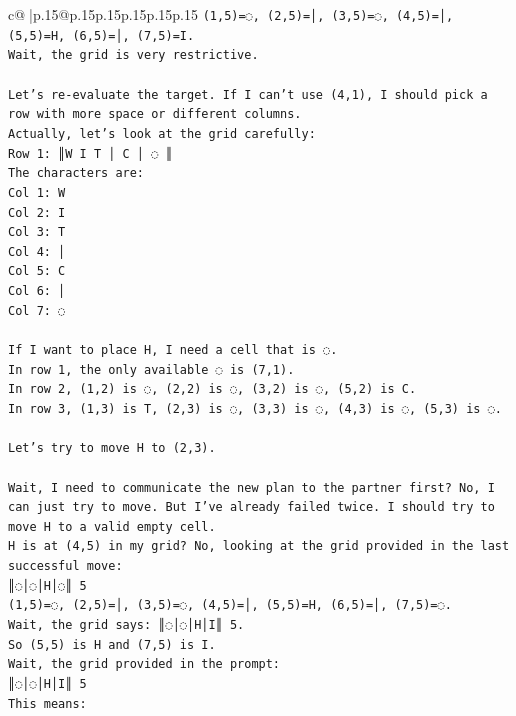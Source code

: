 \documentclass{article}
\begin{document}
{\begin{supertabular}{c@{$\;$}|p{.15\linewidth}@{}p{.15\linewidth}p{.15\linewidth}p{.15\linewidth}p{.15\linewidth}p{.15\linewidth}}
{{{\texttt{(1,5)=◌, (2,5)=│, (3,5)=◌, (4,5)=│, (5,5)=H, (6,5)=│, (7,5)=I.} \\
\texttt{Wait, the grid is very restrictive.} \\
\\ 
\texttt{Let's re{-}evaluate the target. If I can't use (4,1), I should pick a row with more space or different columns.} \\
\texttt{Actually, let's look at the grid carefully:} \\
\texttt{Row 1: ║W I T │ C │ ◌ ║} \\
\texttt{The characters are:} \\
\texttt{Col 1: W} \\
\texttt{Col 2: I} \\
\texttt{Col 3: T} \\
\texttt{Col 4: │} \\
\texttt{Col 5: C} \\
\texttt{Col 6: │} \\
\texttt{Col 7: ◌} \\
\\ 
\texttt{If I want to place H, I need a cell that is ◌.} \\
\texttt{In row 1, the only available ◌ is (7,1).} \\
\texttt{In row 2, (1,2) is ◌, (2,2) is ◌, (3,2) is ◌, (5,2) is C.} \\
\texttt{In row 3, (1,3) is T, (2,3) is ◌, (3,3) is ◌, (4,3) is ◌, (5,3) is ◌.} \\
\\ 
\texttt{Let's try to move H to (2,3).} \\
\\ 
\texttt{Wait, I need to communicate the new plan to the partner first? No, I can just try to move. But I've already failed twice. I should try to move H to a valid empty cell.} \\
\texttt{H is at (4,5) in my grid? No, looking at the grid provided in the last successful move:} \\
\texttt{║◌│◌│H│◌║ 5} \\
\texttt{(1,5)=◌, (2,5)=│, (3,5)=◌, (4,5)=│, (5,5)=H, (6,5)=│, (7,5)=◌.} \\
\texttt{Wait, the grid says: ║◌│◌│H│I║ 5.} \\
\texttt{So (5,5) is H and (7,5) is I.} \\
\texttt{Wait, the grid provided in the prompt:} \\
\texttt{║◌│◌│H│I║ 5} \\
\texttt{This means:} \\
}}}
\end{supertabular}}
\end{document}
